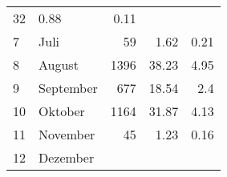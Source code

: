 \begin{longtable}{lXrrr}
       \num{32} &
       \num[round-mode=places,round-precision=2]{0.88} &
         \num[round-mode=places,round-precision=2]{0.11} \\

     7 &
     \multicolumn{1}{X}{ Juli   } &


       \num{59} &
       \num[round-mode=places,round-precision=2]{1.62} &
         \num[round-mode=places,round-precision=2]{0.21} \\

     8 &
     \multicolumn{1}{X}{ August   } &


       \num{1396} &
       \num[round-mode=places,round-precision=2]{38.23} &
         \num[round-mode=places,round-precision=2]{4.95} \\

     9 &
     \multicolumn{1}{X}{ September   } &


       \num{677} &
       \num[round-mode=places,round-precision=2]{18.54} &
         \num[round-mode=places,round-precision=2]{2.4} \\

     10 &
     \multicolumn{1}{X}{ Oktober   } &


       \num{1164} &
       \num[round-mode=places,round-precision=2]{31.87} &
         \num[round-mode=places,round-precision=2]{4.13} \\

     11 &
     \multicolumn{1}{X}{ November   } &


       \num{45} &
       \num[round-mode=places,round-precision=2]{1.23} &
         \num[round-mode=places,round-precision=2]{0.16} \\

     12 &
     \multicolumn{1}{X}{ Dezember   } &



\end{longtable}
